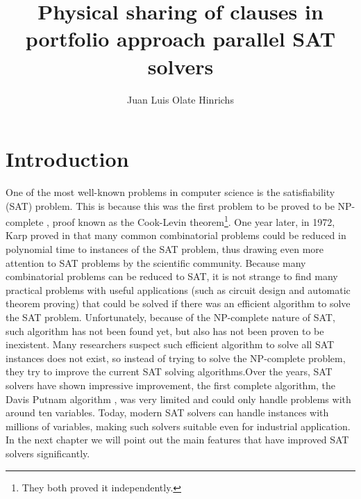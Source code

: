 \documentclass[12pt]{diicc}
\title{\bf Physical sharing of clauses in portfolio approach parallel SAT solvers}
\author{Juan Luis Olate Hinrichs}
\begin{document}
\frontmatter

%


%


%
% 
\mainmatter
\chapter{Introduction}\label{chap:intro}

One of the most well-known problems in computer science is the satisfiability (SAT) problem. This is because this was the first problem to be proved to be NP-complete \cite{cook1971}, proof known as the Cook-Levin theorem\footnote[1]{They both proved it independently.}. One year later, in 1972, Karp proved in \cite{karp1972} that many common combinatorial problems could be reduced in polynomial time to instances of the SAT problem, thus drawing even more attention to SAT problems by the scientific community. Because many combinatorial problems can be reduced to SAT, it is not strange to find many practical problems with useful applications (such as circuit design and automatic theorem proving) that could be solved if there was an efficient algorithm to solve the SAT problem. Unfortunately, because of the NP-complete nature of SAT, such algorithm has not been found yet, but also has not been proven to be inexistent. Many researchers suspect such efficient algorithm to solve all SAT instances does not exist, so instead of trying to solve the NP-complete problem, they try to improve the current SAT solving algorithms.Over the years, SAT solvers have shown impressive improvement, the first complete algorithm, the Davis Putnam algorithm \cite{DP1960}, was very limited and could only handle problems with around ten variables. Today, modern SAT solvers can handle instances with millions of variables, making such solvers suitable even for industrial application. In the next chapter we will point out the main features that have improved SAT solvers significantly. 
\end{document}
